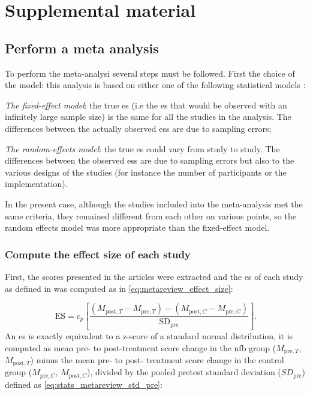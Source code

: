 
\section{Supplemental material}

\subsection{Perform a meta analysis}

To perform the meta-analysi several steps must be followed. First the choice of the model: this analysis is based on either one of the following 
statistical models \citep{Borenstein2009}:
\begin{description}
    \item \textit{The fixed-effect model}: the true \gls{es} (i.e the \gls{es} that would be observed with an infinitely 
		large sample size) is the same for all the studies in the analysis. The differences between the actually observed \gls{es}s 
		are due to sampling errors;
    \item \textit{The random-effects model}: the true \gls{es} could vary from study to study. The differences between the observed
		\gls{es}s are due to sampling errors but also to the various designs of the studies (for instance the number of participants or the implementation).
\end{description}

In the present case, although the studies included into the meta-analysis met the same criteria, they remained different from each other 
on various points, so the random effects model was more appropriate than the fixed-effect model.  

\subsubsection{Compute the effect size of each study}

First, the scores presented in the articles were extracted and the \gls{es} of each study as defined in \citet{Morris2008} 
was computed as in \cref{eq:metareview_effect_size}:

\begin{equation}
\label{eq:metareview_effect_size}
\text{ES} = c_p \left[ \frac{(M_{\text{post},T} - M_{\text{pre},T}) - (M_{\text{post},C} - M_{\text{pre},C}) }{\text{SD}_{\text{pre}}} \right ].
\end{equation} 
An \gls{es} is exactly equivalent to a z-score of a standard normal distribution, it is computed as mean pre- to post-treatment 
score change in the \gls{nfb} group ($M_{\text{pre},T}$, $M_{\text{post},T}$) minus the mean pre- to post- treatment score change 
in the control group ($M_{\text{pre},C}$, $M_{\text{post},C}$), divided by the pooled pretest standard deviation ($SD_{\text{pre}}$) 
defined as \cref{eq:stats_metareview_std_pre}:

